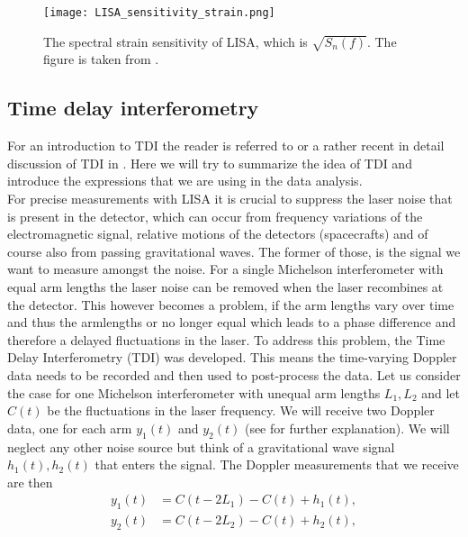 \begin{figure}
    \centering
    \texttt{[image: LISA\_sensitivity\_strain.png]}
    \caption[LISA spectral strain sensitivity]{The spectral strain sensitivity of LISA, which is $\sqrt{S_n(f)}$. The figure is taken from \cite{colpi2024lisadefinitionstudyreport}.}
    \label{fig:lisa-sensitivity}
\end{figure}

\subsection{Time delay interferometry}
For an introduction to TDI the reader is referred to \cite{Tinto_2021} or a rather recent in detail discussion of TDI in \cite{heisenberg2023lisadynamicscontrol}. Here we will try to summarize the idea of TDI and introduce the expressions that we are using in the data analysis.\\
For precise measurements with LISA it is crucial to suppress the laser noise that is present in the detector, which can occur from frequency variations of the electromagnetic signal, relative motions of the detectors (spacecrafts) and of course also from passing gravitational waves. The former of those, is the signal we want to measure amongst the noise. For a single Michelson interferometer with equal arm lengths the laser noise can be removed when the laser recombines at the detector. This however becomes a problem, if the arm lengths vary over time and thus the armlengths or no longer equal which leads to a phase difference and therefore a delayed fluctuations in the laser. To address this problem, the Time Delay Interferometry (TDI) was developed. This means the time-varying Doppler data needs to be recorded and then used to post-process the data. Let us consider the case for one Michelson interferometer with unequal arm lengths $L_1, L_2$ and let $C(t)$ be the fluctuations in the laser frequency. We will receive two Doppler data, one for each arm $y_1(t)$ and $y_2(t)$ (see \cite[Figure 1, Figure 2]{Tinto_2021} for further explanation). We will neglect any other noise source but think of a gravitational wave signal $h_1(t), h_2(t)$ that enters the signal. The Doppler measurements that we receive are then
\begin{equation}
    \begin{split}
        y_1(t) &= C(t - 2L_1) - C(t) + h_1(t),\\
        y_2(t) &= C(t - 2L_2) - C(t) + h_2(t),
    \end{split}
\end{equation}

